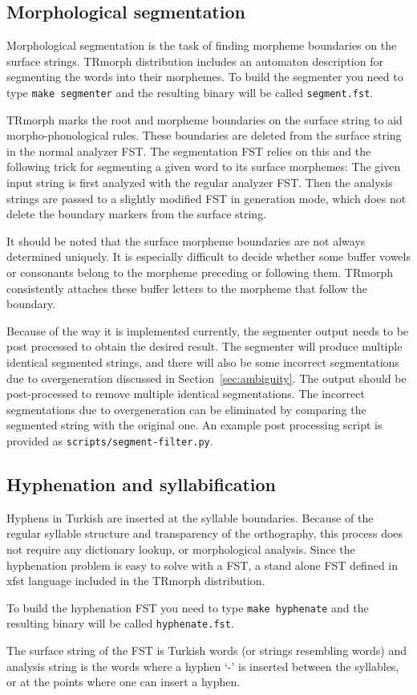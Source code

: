 \documentclass[twocolumn]{article}
\begin{document}
\subsection{Morphological segmentation}

Morphological segmentation is the task of finding morpheme boundaries
on the surface strings. TRmorph distribution includes an automaton
description for segmenting the words into their morphemes.  To build
the segmenter you need to type \lstinline{make segmenter} and the
resulting binary will be called \lstinline{segment.fst}.

TRmorph marks the root and morpheme boundaries on the surface string
to aid morpho-phonological rules. These boundaries are deleted from
the surface string in the normal analyzer FST. The segmentation FST
relies on this and the following trick for segmenting a given word to
its surface morphemes: The given input string is first analyzed with
the regular analyzer FST. Then the analysis strings are passed to a
slightly modified FST in generation mode, which does not delete the
boundary markers from the surface string. 

It should be noted that the surface morpheme boundaries are not always
determined uniquely. It is especially difficult to decide whether some
buffer vowels or consonants belong to the morpheme preceding or
following them. TRmorph consistently attaches these buffer letters to
the morpheme that follow the boundary.

Because of the way it is implemented currently, the segmenter output needs to be post
processed to obtain the desired result. The segmenter will produce
multiple identical segmented strings, and there will also be some
incorrect segmentations due to overgeneration discussed in
Section~\ref{sec:ambiguity}. The output should be post-processed to
remove multiple identical segmentations.
The incorrect segmentations due to 
overgeneration can be eliminated by comparing the segmented string
with the original one. An example post processing script is provided
as \lstinline{scripts/segment-filter.py}.


\subsection{Hyphenation and syllabification}

Hyphens in Turkish are inserted at the syllable boundaries.  Because
of the regular syllable structure and transparency of the orthography,
this process does not require any dictionary lookup, or morphological
analysis. Since the hyphenation problem is easy to solve with a FST, a
stand alone FST defined in xfst language included in the TRmorph
distribution.

To build the hyphenation FST you need to type 
\lstinline{make hyphenate} and the resulting binary will be called
\lstinline{hyphenate.fst}.

The surface string of the FST is Turkish words (or strings resembling
words) and analysis string is the words where a hyphen `-' is inserted
between the syllables, or at the points where one can insert a hyphen.

\printbibliography

\printindex
\end{document}
